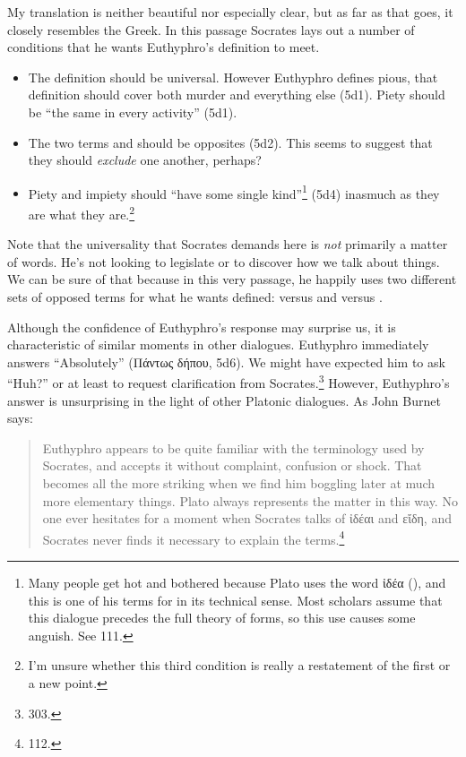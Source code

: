 \documentclass[11pt]{article}
\begin{document}
My translation is neither beautiful nor especially clear, but as far as that goes, it closely resembles the Greek.  In this passage Socrates lays out a number of conditions that he wants Euthyphro's definition to meet.

\begin{itemize}

    \item The definition should be universal.  However Euthyphro defines pious, that definition should cover both murder and everything else (5d1).  Piety should be ``the same in every activity'' (5d1).
    \item The two terms  and  should be opposites (5d2).  This seems to suggest that they should \emph{exclude} one another, perhaps?
    \item Piety and impiety should ``have some single kind''\footnote{Many people get hot and bothered because Plato uses the word {\g ἰδέα} (), and this is one of his terms for  in its technical sense.  Most scholars assume that this dialogue precedes the full theory of forms, so this use causes some anguish.  See \citet{burnet1924} 111.} (5d4) inasmuch as they are what they are.\footnote{I'm unsure whether this third condition is really a restatement of the first or a new point.}

\end{itemize}

Note that the universality that Socrates demands here is \emph{not} primarily a matter of words.  He's not looking to legislate or to discover how we talk about things.  We can be sure of that because in this very passage, he happily uses two different sets of opposed terms for what he wants defined:  versus  and  versus .

Although the confidence of Euthyphro's response may surprise us, it is characteristic of similar moments in other dialogues.  Euthyphro immediately answers ``Absolutely'' ({\g Πάντως δήπου}, 5d6).  We might have expected him to ask ``Huh?'' or at least to request clarification from Socrates.\footnote{\citet{nehamas1975} 303.}  However, Euthyphro's answer is unsurprising in the light of other Platonic dialogues.  As John Burnet says:

\begin{quote}

    Euthyphro appears to be quite familiar with the terminology used by Socrates, and accepts it without complaint, confusion or shock.  That becomes all the more striking when we find him boggling later at much more elementary things.  Plato always represents the matter in this way.  No one ever hesitates for a moment when Socrates talks of {\g ἰδέαι} and {\g εἴδη}, and Socrates never finds it necessary to explain the terms.\footnote{\citet{burnet1924} 112.}

\end{quote}
\end{document}
